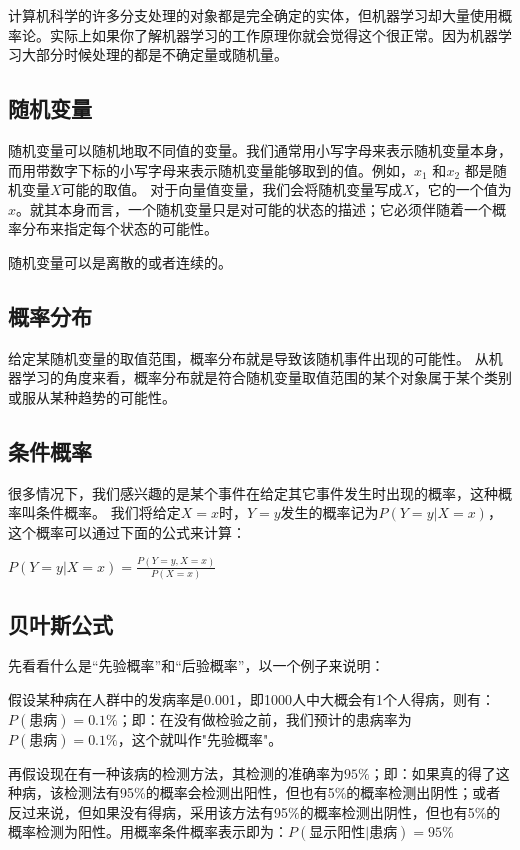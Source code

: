 \documentclass[11pt]{book}
\newcounter{#2}
\newcounter{#2}[#1]
\numberwithin{#2}{#1}
\begin{document}
计算机科学的许多分支处理的对象都是完全确定的实体，但机器学习却大量使用概率论。实际上如果你了解机器学习的工作原理你就会觉得这个很正常。因为机器学习大部分时候处理的都是不确定量或随机量。

\subsection{随机变量}

随机变量可以随机地取不同值的变量。我们通常用小写字母来表示随机变量本身，而用带数字下标的小写字母来表示随机变量能够取到的值。例如，$ x_{1} $ 和$ x_{2} $  都是随机变量$ X $可能的取值。
对于向量值变量，我们会将随机变量写成$ X $，它的一个值为$ x $。就其本身而言，一个随机变量只是对可能的状态的描述；它必须伴随着一个概率分布来指定每个状态的可能性。

随机变量可以是离散的或者连续的。

\subsection{概率分布}

给定某随机变量的取值范围，概率分布就是导致该随机事件出现的可能性。
从机器学习的角度来看，概率分布就是符合随机变量取值范围的某个对象属于某个类别或服从某种趋势的可能性。
\subsection{条件概率}

很多情况下，我们感兴趣的是某个事件在给定其它事件发生时出现的概率，这种概率叫条件概率。
我们将给定$ X=x $时，$ Y=y $发生的概率记为$ P\left( Y=y|X=x \right)  $，这个概率可以通过下面的公式来计算：

$ P\left( Y=y|X=x  \right) =\frac{P\left( Y=y,X=x \right) }{P\left( X=x \right) }  $

\subsection{贝叶斯公式}

先看看什么是“先验概率”和“后验概率”，以一个例子来说明：

假设某种病在人群中的发病率是0.001，即1000人中大概会有1个人得病，则有：$ P(患病) = 0.1\% $；即：在没有做检验之前，我们预计的患病率为$ P(患病)=0.1\% $，这个就叫作"先验概率"。 

再假设现在有一种该病的检测方法，其检测的准确率为$ 95\% $；即：如果真的得了这种病，该检测法有95\%的概率会检测出阳性，但也有5\%的概率检测出阴性；或者反过来说，但如果没有得病，采用该方法有95\%的概率检测出阴性，但也有5\%的概率检测为阳性。用概率条件概率表示即为：$ P(显示阳性|患病)=95\% $
\end{document}
